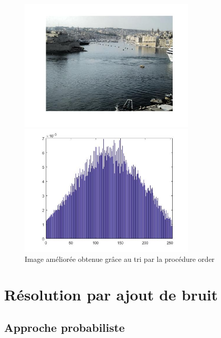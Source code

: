 \documentclass{report}
\begin{document}
\begin{figure}
\centering
\begin{minipage}{width=0.5\textwidth}
\centering
\includegraphics[width=0.75\textwidth]{images/im_xx.jpg}
\end{minipage}%
\begin{minipage}{width=0.5\textwidth}
\centering
\includegraphics[width=0.75\textwidth]{images/hist_xx.jpg}
\end{minipage}
\caption{Image améliorée obtenue grâce au tri par la procédure order}
\label{fig:im_xx}
\end{figure}

\section*{Résolution par ajout de bruit}
\subsection*{Approche probabiliste}
\end{document}
